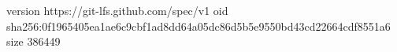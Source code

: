 version https://git-lfs.github.com/spec/v1
oid sha256:0f1965405ea1ae6c9cbf1ad8dd64a05dc86d5b5e9550bd43cd22664cdf8551a6
size 386449
